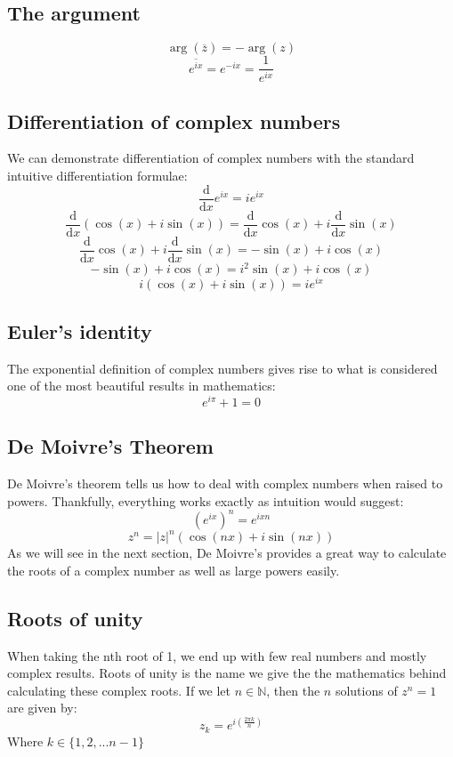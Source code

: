 \documentclass[12pt]{article}
\newcommand{\df}[2]{\frac{\text{d}#1}{\text{d}#2}}
\begin{document}
\subsection*{The argument}
\[\arg(\overline{z})=-\arg(z)\]
\[\overline{e^{ix}}=e^{-ix}=\frac{1}{e^{ix}}\]
\subsection*{Differentiation of complex numbers}
We can demonstrate differentiation of complex numbers with the standard intuitive differentiation formulae:
\[\df{}{x}e^{ix}=ie^{ix}\]
\[\df{}{x}(\cos(x)+i\sin(x))=\df{}{x}\cos(x)+i\df{}{x}\sin(x)\]
\[\df{}{x}\cos(x)+i\df{}{x}\sin(x)=-\sin(x)+i\cos(x)\]
\[-\sin(x)+i\cos(x)=i^2\sin(x)+i\cos(x)\]
\[i(\cos(x)+i\sin(x))=ie^{ix}\]
\subsection*{Euler's identity}
The exponential definition of complex numbers gives rise to what is considered one of the most beautiful results in mathematics:
\[e^{i\pi}+1=0\]
\subsection*{De Moivre's Theorem}
De Moivre's theorem tells us how to deal with complex numbers when raised to powers. Thankfully, everything works exactly as intuition would suggest:
\[(e^{ix})^n=e^{ixn}\]
\[z^n=|z|^n(\cos(nx)+i\sin(nx))\]
As we will see in the next section, De Moivre's provides a great way to calculate the roots of a complex number as well as large powers easily.
\subsection*{Roots of unity}
When taking the nth root of 1, we end up with few real numbers and mostly complex results. Roots of unity is the name we give the the mathematics behind calculating these complex roots. If we let \(n\in\mathbb{N}\), then the \(n\) solutions of \(z^n=1\) are given by:
\[z_k=e^{i\left(\frac{2\pi k}{n}\right)}\]
Where \(k\in\{1,2,...n-1\}\)
\end{document}
